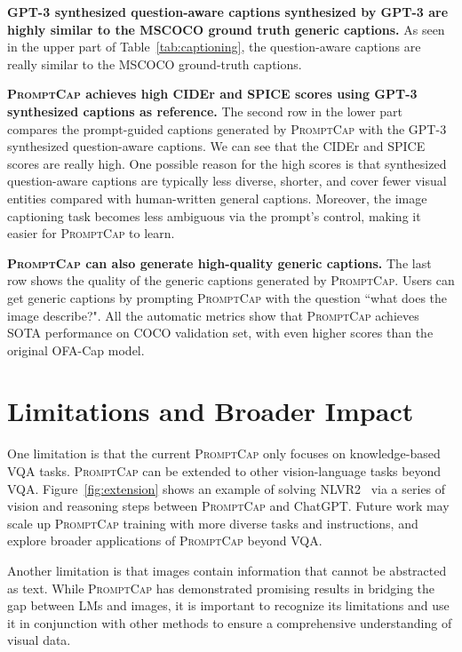 \documentclass[10pt,twocolumn,letterpaper]{article}
\newcommand{\NAME}{\textsc{PromptCap}\xspace}
\begin{document}
\vspace{1mm}
\noindent\textbf{GPT-3 synthesized question-aware captions synthesized by GPT-3 are highly similar to the MSCOCO ground truth generic captions.} As seen in the upper part of Table~\ref{tab:captioning}, the question-aware captions are really similar to the MSCOCO ground-truth captions.

\vspace{1mm}
\noindent\textbf{\NAME achieves high CIDEr and SPICE scores using GPT-3 synthesized captions as reference.} 
The second row in the lower part compares the prompt-guided captions generated by \NAME with the GPT-3 synthesized question-aware captions. We can see that the CIDEr and SPICE scores are really high. One possible reason for the high scores is that synthesized question-aware captions are typically less diverse, shorter, and cover fewer visual entities compared with human-written general captions.
Moreover, the image captioning task becomes less ambiguous via the prompt's control, making it easier for \NAME to learn.

\vspace{1mm}
\noindent\textbf{\NAME can also generate high-quality generic captions.}
The last row shows the quality of the generic captions generated by \NAME. Users can get generic captions by prompting \NAME with the question ``what does the image describe?". All the automatic metrics show that \NAME achieves SOTA performance on COCO validation set, with even higher scores than the original OFA-Cap model. 



\section{Limitations and Broader Impact}



One limitation is that the current \NAME only focuses on knowledge-based VQA tasks. 
\NAME can be extended to other vision-language tasks beyond VQA. Figure~\ref{fig:extension} shows an example of solving NLVR2~\cite{suhr2019orpus} via a series of vision and reasoning steps between \NAME and ChatGPT.
Future work may scale up \NAME training with more diverse tasks and instructions, and explore broader applications of \NAME beyond VQA.

Another limitation is that images contain information that cannot be abstracted as text. While \NAME has demonstrated promising results in bridging the gap between LMs and images, it is important to recognize its limitations and use it in conjunction with other methods to ensure a comprehensive understanding of visual data.
\end{document}
